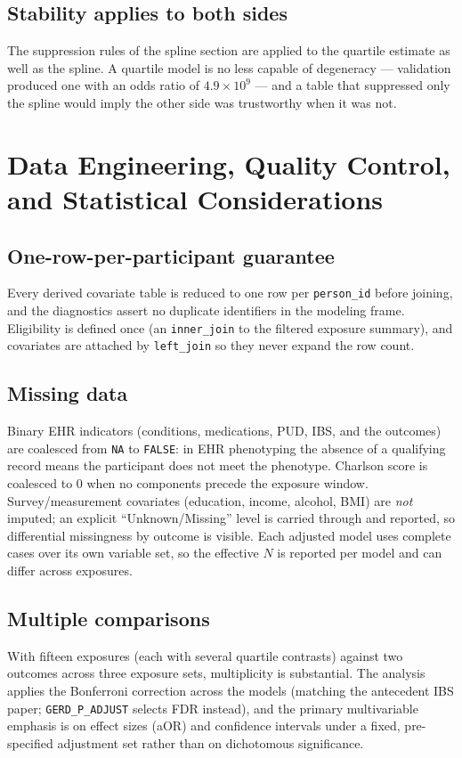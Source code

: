 \documentclass[11pt]{article}
\newcommand{\code}[1]{\texttt{\small #1}}
\begin{document}
\subsection{Stability applies to both sides}
The suppression rules of the spline section
are applied to the quartile estimate as well as the spline. A quartile model is
no less capable of degeneracy --- validation produced one with an odds ratio of
$4.9 \times 10^9$ --- and a table that suppressed only the spline would imply
the other side was trustworthy when it was not.

\section{Data Engineering, Quality Control, and Statistical Considerations}

\subsection{One-row-per-participant guarantee}
Every derived covariate table is reduced to one row per \code{person_id} before joining, and the
diagnostics assert no duplicate identifiers in the modeling frame. Eligibility is defined once (an
\code{inner_join} to the filtered exposure summary), and covariates are attached by \code{left_join} so
they never expand the row count.

\subsection{Missing data}
Binary EHR indicators (conditions, medications, PUD, IBS, and the outcomes) are coalesced from
\code{NA} to \code{FALSE}: in EHR phenotyping the absence of a qualifying record means the participant
does not meet the phenotype. Charlson score is coalesced to $0$ when no components precede the exposure
window. Survey/measurement covariates (education, income, alcohol, BMI) are \emph{not} imputed; an
explicit ``Unknown/Missing'' level is carried through and reported, so differential missingness by
outcome is visible. Each adjusted model uses complete cases over its own variable set, so the effective
$N$ is reported per model and can differ across exposures.

\subsection{Multiple comparisons}
With fifteen exposures (each with several quartile contrasts) against two outcomes across three exposure
sets, multiplicity is substantial. The analysis applies the Bonferroni correction across the models
(matching the antecedent IBS paper; \code{GERD_P_ADJUST} selects FDR instead), and the primary multivariable emphasis is on effect sizes
(aOR) and confidence intervals under a fixed, pre-specified adjustment set rather than on dichotomous
significance.
\end{document}
